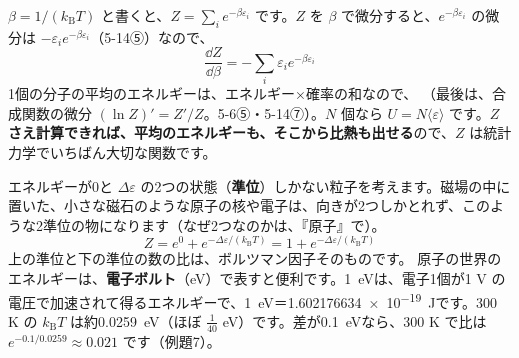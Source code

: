 \label{ph:熱-15:sec7}
$\beta=1/(k_{\mathrm B}T)$ と書くと、$Z=\sum_ie^{-\beta\varepsilon_i}$ です。$Z$ を $\beta$ で微分すると、$e^{-\beta\varepsilon_i}$ の微分は $-\varepsilon_ie^{-\beta\varepsilon_i}$（5-14⑤）なので、
\[\frac{\dd Z}{\dd\beta}=-\sum_i\varepsilon_ie^{-\beta\varepsilon_i}\]
1個の分子の平均のエネルギーは、エネルギー×確率の和なので、
（最後は、合成関数の微分 $(\ln Z)'=Z'/Z$。5-6⑤・5-14⑦）。$N$ 個なら $U=N\langle\varepsilon\rangle$ です。\textbf{$Z$ さえ計算できれば、平均のエネルギーも、そこから比熱も出せる}ので、$Z$ は統計力学でいちばん大切な関数です。

エネルギーが0と $\Delta\varepsilon$ の2つの状態（\textbf{準位}）しかない粒子を考えます。磁場の中に置いた、小さな磁石のような原子の核や電子は、向きが2つしかとれず、このような2準位の物になります（なぜ2つなのかは、『原子』で）。
\[Z=e^{0}+e^{-\Delta\varepsilon/(k_{\mathrm B}T)}=1+e^{-\Delta\varepsilon/(k_{\mathrm B}T)}\]
上の準位と下の準位の数の比は、ボルツマン因子そのものです。
原子の世界のエネルギーは、\textbf{電子ボルト}（eV）で表すと便利です。\qty{1}{eV}は、電子1個が1 V の電圧で加速されて得るエネルギーで、\qty{1}{eV}＝\qty{1.602176634e-19}{J}です。300 K の $k_{\mathrm B}T$ は約\qty{0.0259}{eV}（ほぼ $\tfrac{1}{40}$ eV）です。差が\qty{0.1}{eV}なら、300 K で比は $e^{-0.1/0.0259}\approx0.021$ です（例題7）。

